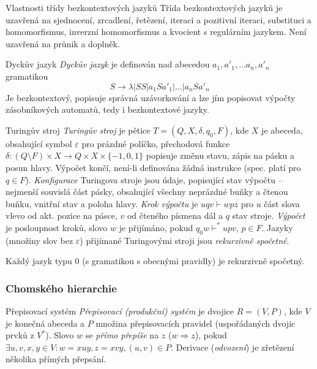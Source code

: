 \begin{poznamkaN}{Vlastnosti třídy bezkontextových jazyků}
Třída bezkontextových jazyků je uzavřená na sjednocení, zrcadlení, řetězení, iteraci a pozitivní iteraci, substituci a homomorfismus, inverzní homomorfismus a kvocient s regulárním jazykem. Není uzavřená na průnik a doplněk.
\end{poznamkaN}

\begin{definiceN}{Dyckův jazyk}
\emph{Dyckův jazyk} je definován nad abecedou ${a_1,a'_1,...a_n,a'_n}$ gramatikou $$S\to \lambda | SS | a_{1}Sa'_1 | ... | a_{n}Sa'_n$$ Je bezkontextový, popisuje správná uzávorkování a lze jím popisovat výpočty zásobníkových automatů, tedy i bezkontextové jazyky.
\end{definiceN}

\begin{definiceN}{Turingův stroj}
\emph{Turingův stroj} je pětice $T=(Q,X,\delta,q_0,F)$, kde $X$ je abeceda, obsahující symbol $\varepsilon$ pro prázdné políčko, přechodová funkce $\delta:(Q\setminus F)\times X\to Q\times X\times\{-1,0,1\}$ popisuje změnu stavu, zápis na pásku a posun hlavy. Výpočet končí, není-li definována žádná instrukce (spec. platí pro $q\in F$). \emph{Konfigurace} Turingova stroje jsou údaje, popisující stav výpočtu -- nejmenší souvislá část pásky, obsahující všechny neprázdné buňky a čtenou buňku, vnitřní stav a poloha hlavy. \emph{Krok výpočtu} je $uqv \vdash wpz$ pro $u$ část slova vlevo od akt. pozice na pásce, $v$ od čteného písmena dál a $q$ stav stroje. \emph{Výpočet} je posloupnost kroků, slovo $w$ je přijímáno, pokud $q_{0}w \vdash^{\ast} upv$, $p\in F$. Jazyky (množiny slov bez $\varepsilon$) přijímané Turingovými stroji jsou \emph{rekurzivně spočetné}.
\end{definiceN}

\begin{veta}
Každý jazyk typu 0 (s gramatikou s obecnými pravidly) je rekurzivně spočetný.
\end{veta}

\subsubsection*{Chomského hierarchie}

\begin{definiceN}{Přepisovací systém}
\emph{Přepisovací (produkční) systém} je dvojice $R=(V,P)$, kde $V$ je konečná abeceda a $P$ množina přepisovacích pravidel (uspořádaných dvojic prvků z $V^{\ast}$). Slovo $w$ se \emph{přímo přepíše} na $z$ ($w\Rightarrow z$), pokud $\exists u,v,x,y\in V: w = xuy, z = xvy, (u,v)\in P$. Derivace (\emph{odvození}) je zřetězení několika přímých přepsání.
\end{definiceN}

